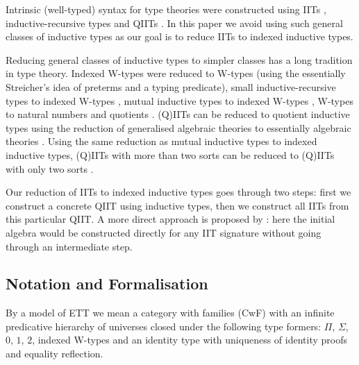 \documentclass[a4paper,UKenglish,cleveref, autoref]{lipics-v2019}
\begin{document}
Intrinsic (well-typed) syntax for type theories were constructed using
IITs \cite{chapman09eatitself}, inductive-recursive types
\cite{nisse,Altenkirch:2014:CO:2631172.2631176} and QIITs
\cite{ttintt}. In this paper we avoid using such general classes of
inductive types as our goal is to reduce IITs to indexed inductive
types.

Reducing general classes of inductive types to simpler classes has a
long tradition in type theory. Indexed W-types were reduced to W-types
\cite{indexedcont} (using the essentially Streicher's idea of preterms
and a typing predicate), small inductive-recursive types to indexed
W-types \cite{malatasta13smallir}, mutual inductive types to indexed
W-types \cite{mutual}, W-types to natural numbers and quotients
\cite{Ahrens2019}. (Q)IITs can be reduced to quotient inductive types
using the reduction of generalised algebraic theories to essentially
algebraic theories \cite{gat}. Using the same reduction as mutual
inductive types to indexed inductive types, (Q)IITs with more than two
sorts can be reduced to (Q)IITs with only two sorts \cite{szumiemail}.

Our reduction of IITs to indexed inductive types goes through two
steps: first we construct a concrete QIIT using inductive types, then
we construct all IITs from this particular QIIT. A more direct
approach is proposed by \cite{erasure}: here the initial algebra would
be constructed directly for any IIT signature without going through an
intermediate step.

\subsection{Notation and Formalisation}

\begin{definition}
  By a model of ETT we mean a category with families (CwF)
  \cite{Dybjer96internaltype,Hofmann97syntaxand} with an infinite
  predicative hierarchy of universes closed under the following type
  formers: $\Pi$, $\Sigma$, $0$, $1$, $2$, indexed W-types
  \cite{indexedcont} and an identity type with uniqueness of identity
  proofs and equality reflection.
\end{definition}
\end{document}
